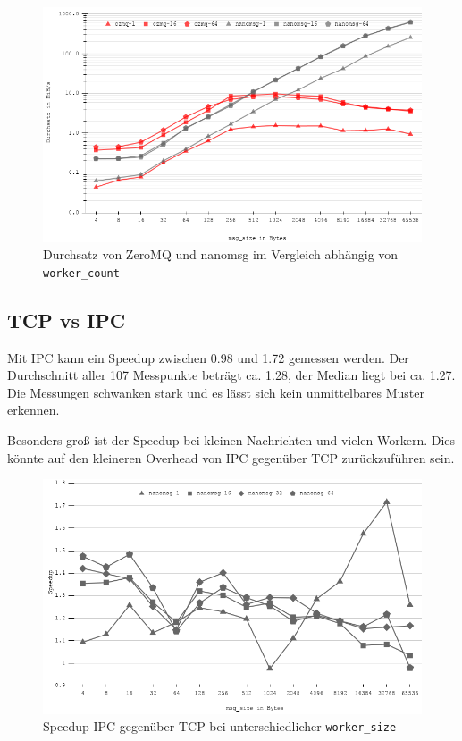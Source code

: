 \documentclass{article}
\begin{document}
\begin{figure}[htbp]
\includegraphics[width=12cm]{images/chart(3).png}
\caption{Durchsatz von ZeroMQ und nanomsg im Vergleich abhängig von \texttt{worker\_count}}
\end{figure}

\subsection{TCP vs IPC}

Mit IPC kann ein Speedup zwischen 0.98 und 1.72 gemessen werden. Der
Durchschnitt aller 107 Messpunkte beträgt ca. 1.28, der Median liegt bei
ca. 1.27. Die Messungen schwanken stark und es lässt sich kein
unmittelbares Muster erkennen.

Besonders groß ist der Speedup bei kleinen Nachrichten und vielen Workern. 
Dies könnte auf den kleineren Overhead von IPC gegenüber TCP zurückzuführen
sein. 

\begin{figure}[htbp]
\centering
\includegraphics[width=12cm]{images/chart(4).png}
\caption{Speedup IPC gegenüber TCP bei unterschiedlicher \texttt{worker\_size}}
\end{figure}
\end{document}
